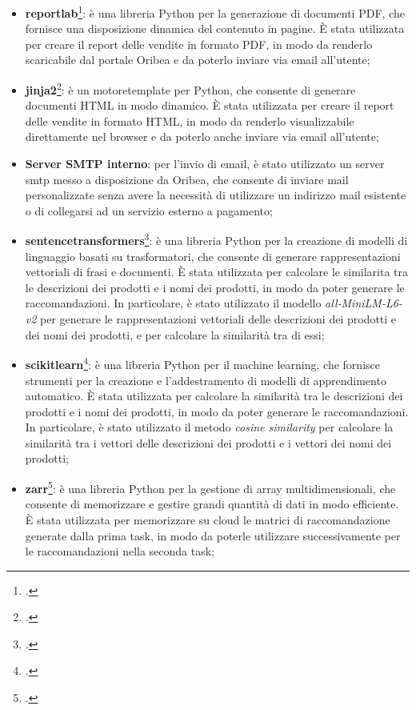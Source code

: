 \begin{itemize}
    \item \textbf{\gls{reportlab}}\footcite{site:reportlab}: è una libreria Python per la generazione di documenti PDF, che fornisce una disposizione dinamica del contenuto in pagine. È stata utilizzata per creare il report delle vendite in formato PDF, in modo da renderlo scaricabile dal portale Oribea e da poterlo inviare via email all'utente;
    
    \item \textbf{\gls{jinja2}}\footcite{site:jinja2}: è un \gls{motoretemplate} per Python, che consente di generare documenti HTML in modo dinamico. È stata utilizzata per creare il report delle vendite in formato HTML, in modo da renderlo visualizzabile direttamente nel browser e da poterlo anche inviare via email all'utente;
    
    \item \textbf{Server SMTP interno}: per l'invio di email, è stato utilizzato un server \gls{smtp} messo a disposizione da Oribea, che consente di inviare mail personalizzate senza avere la necessità di utilizzare un indirizzo mail esistente o di collegarsi ad un servizio esterno a pagamento;
    
    \item \textbf{\gls{sentencetransformers}}\footcite{site:sentence-transformers}: è una libreria Python per la creazione di modelli di linguaggio basati su trasformatori, che consente di generare rappresentazioni vettoriali di frasi e documenti. È stata utilizzata per calcolare le \gls{similarita} tra le descrizioni dei prodotti e i nomi dei prodotti, in modo da poter generare le raccomandazioni. In particolare, è stato utilizzato il modello \emph{all-MiniLM-L6-v2} per generare le rappresentazioni vettoriali delle descrizioni dei prodotti e dei nomi dei prodotti, e per calcolare la similarità tra di essi;
    
    \item \textbf{\gls{scikitlearn}}\footcite{site:scikit-learn}: è una libreria Python per il machine learning, che fornisce strumenti per la creazione e l'addestramento di modelli di apprendimento automatico. È stata utilizzata per calcolare la similarità tra le descrizioni dei prodotti e i nomi dei prodotti, in modo da poter generare le raccomandazioni. In particolare, è stato utilizzato il metodo \emph{cosine similarity} per calcolare la similarità tra i vettori delle descrizioni dei prodotti e i vettori dei nomi dei prodotti;
    
    \item \textbf{\gls{zarr}}\footcite{site:zarr}: è una libreria Python per la gestione di array multidimensionali, che consente di memorizzare e gestire grandi quantità di dati in modo efficiente. È stata utilizzata per memorizzare su cloud le matrici di raccomandazione generate dalla prima task, in modo da poterle utilizzare successivamente per le raccomandazioni nella seconda task;
    

\end{itemize}
